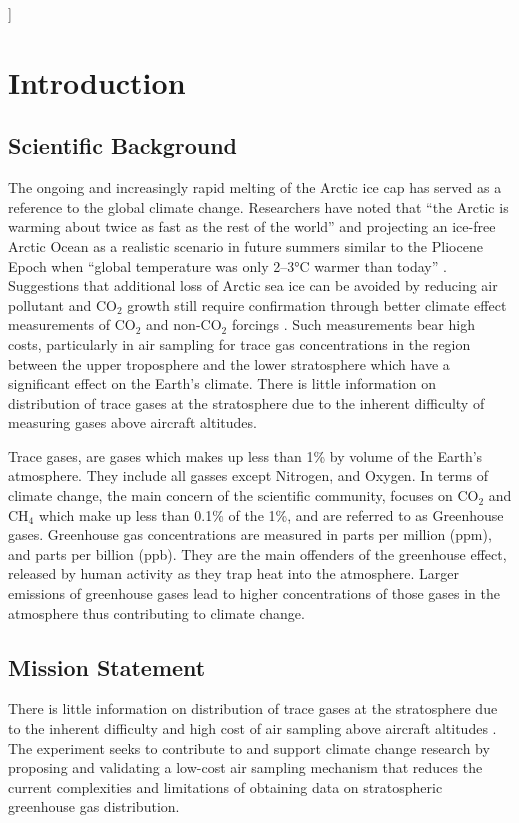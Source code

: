 ]\documentclass[a4paper,12pt,twoside]{article}
\begin{document}
%

\section{Introduction}
\subsection{Scientific Background}

The ongoing and increasingly rapid melting of the Arctic ice cap has served as a reference to the global climate change. Researchers have noted that \enquote{the Arctic is warming about twice as fast as the rest of the world} \cite{Perkins} and projecting an ice-free Arctic Ocean as a realistic scenario in future summers similar to the Pliocene Epoch when \enquote{global temperature was only 2–3°C warmer than today} \cite{Trace}. Suggestions that additional loss of Arctic sea ice can be avoided by reducing air pollutant and CO$_{2}$ growth still require confirmation through better climate effect measurements of CO$_{2}$ and non-CO$_{2}$ forcings \cite{Trace}. Such measurements bear high costs, particularly in air sampling for trace gas concentrations in the region between the upper troposphere and the lower stratosphere which have a significant effect on the Earth's climate. There is little information on distribution of trace gases at the stratosphere due to the inherent difficulty of measuring gases above aircraft altitudes.

Trace gases, are gases which makes up less than 1\% by volume of the Earth's atmosphere. They include all gasses except Nitrogen, and Oxygen. In terms of climate change, the main concern of the scientific community, focuses on CO$_2$ and CH$_4$ which make up less than 0.1\% of the 1\%, and are referred to as Greenhouse gases. Greenhouse gas concentrations are measured in parts per million (ppm), and parts per billion (ppb). They are the main offenders of the greenhouse effect, released by human activity as they trap heat into the atmosphere. Larger emissions of greenhouse gases lead to higher concentrations of those gases in the atmosphere thus contributing to climate change.

\subsection{Mission Statement}

There is little information on distribution of trace gases at the stratosphere due to the inherent difficulty and high cost of air sampling above aircraft altitudes \cite{Trace}. The experiment seeks to contribute to and support climate change research by proposing and validating a low-cost air sampling mechanism that reduces the current complexities and limitations of obtaining data on stratospheric greenhouse gas distribution.
\pagebreak
\end{document}
